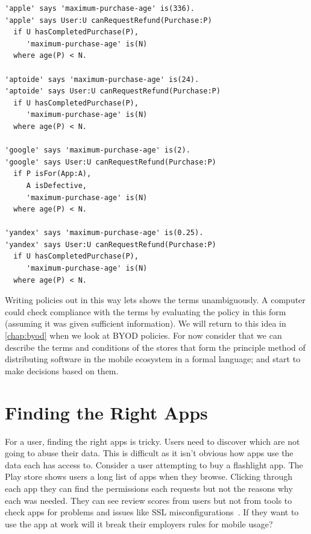 \documentclass[thesis.tex]{subfiles}
\begin{document}
\begin{lstlisting}
'apple' says 'maximum-purchase-age' is(336).
'apple' says User:U canRequestRefund(Purchase:P)
  if U hasCompletedPurchase(P),
     'maximum-purchase-age' is(N)
  where age(P) < N.

'aptoide' says 'maximum-purchase-age' is(24).
'aptoide' says User:U canRequestRefund(Purchase:P)
  if U hasCompletedPurchase(P),
     'maximum-purchase-age' is(N)
  where age(P) < N.

'google' says 'maximum-purchase-age' is(2).
'google' says User:U canRequestRefund(Purchase:P)
  if P isFor(App:A),
     A isDefective,
     'maximum-purchase-age' is(N)
  where age(P) < N.

'yandex' says 'maximum-purchase-age' is(0.25).
'yandex' says User:U canRequestRefund(Purchase:P)
  if U hasCompletedPurchase(P),
     'maximum-purchase-age' is(N)
  where age(P) < N.
\end{lstlisting}

Writing policies out in this way lets shows the terms unambiguously.  A computer could check compliance with the terms by evaluating the policy in this form (assuming it was given sufficient information). We will return to this idea in \autoref{chap:byod} when we look at BYOD policies.
For now consider that we can describe the terms and conditions of the stores that form the principle method of distributing software in the mobile ecosystem in a formal language; and start to make decisions based on them.

\section{Finding the Right Apps}

For a user, finding the right apps is tricky.  Users need to
discover which are not going to abuse their data.  This is
difficult as it isn't obvious how apps use the data each has access
to.  Consider a user attempting to buy a flashlight app.
The Play store shows users a long list of apps when they browse.
Clicking through each app they can find the permissions each requests
but not the reasons why each was needed.  They can see review scores
from users but not from tools to check apps for problems and issues
like SSL misconfigurations~\cite{fahl_why_2012}.  If they want to use
the app at work will it break their employers rules for mobile usage?
\end{document}
